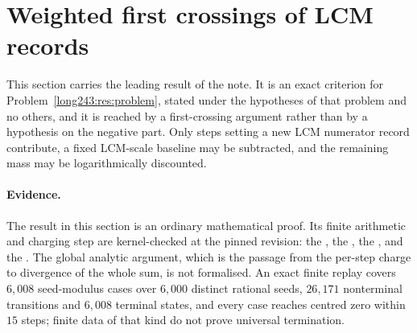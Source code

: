 \documentclass[11pt]{article}
\begin{document}
\section{Weighted first crossings of LCM records}\label{long243:sec:lcmrecords}

This section carries the leading result of the note.  It is an exact criterion
for Problem~\ref{long243:res:problem}, stated under the hypotheses of that problem and
no others, and it is reached by a first-crossing argument rather than by a
hypothesis on the negative part.  Only steps setting a new LCM numerator record
contribute, a fixed LCM-scale baseline may be subtracted, and the remaining mass
may be logarithmically discounted.

\paragraph{Evidence.}
The result in this section is an ordinary mathematical proof.  Its finite
arithmetic and charging step are kernel-checked at the pinned revision: the
,
the
, the
, and
the
.  The global analytic argument, which is the passage from the per-step
charge to divergence of the whole sum, is not formalised.  An exact finite
replay covers $6{,}008$ seed-modulus cases over $6{,}000$ distinct rational
seeds, $26{,}171$ nonterminal transitions and $6{,}008$ terminal states, and
every case reaches centred zero within $15$ steps; finite data of that kind do
not prove universal termination.
\end{document}
